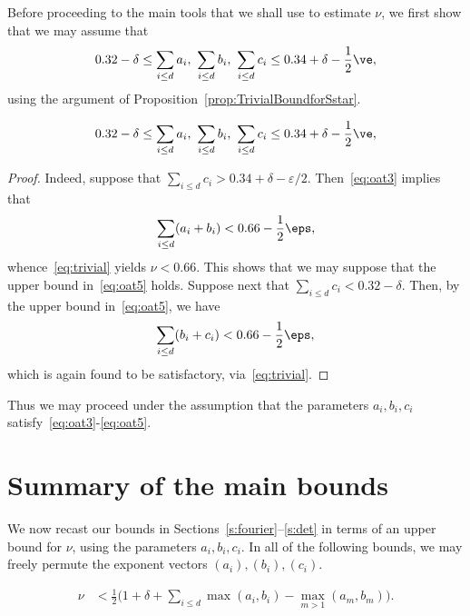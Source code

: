 Before proceeding to the main tools that we shall use to estimate $\nu$, we first show that we may assume that
\begin{equation*}
0.32 - \delta \leq \sum_{i\leq d} a_i ,~ \sum_{i\leq d} b_i ,~ \sum_{i\leq d} c_i \leq 0.34 + \delta- \frac{1}{2}\ve,
\end{equation*}
using the argument of Proposition~\ref{prop:TrivialBoundforSstar}.
\begin{proposition}\label{prop:Eqn4Point5}
  \begin{equation}\label{eq:oat5}
    0.32 - \delta \leq \sum_{i\leq d} a_i ,~ \sum_{i\leq d} b_i ,~ \sum_{i\leq d} c_i \leq 0.34 + \delta- \frac{1}{2}\ve,
  \end{equation}
\end{proposition}
\begin{proof}
  Indeed, suppose that
  $\sum_{i\leq d} c_i> 0.34 + \delta-\varepsilon/2$.
  Then~\eqref{eq:oat3} implies that
  \[
  \sum_{i\leq d} (a_i + b_i)<
  0.66-\frac{1}{2}\eps,
  \]
  whence~\eqref{eq:trivial} yields $\nu< 0.66$. This shows that we may suppose that the upper bound in~\eqref{eq:oat5} holds.
  Suppose next that
  $\sum_{i\leq d} c_i< 0.32 - \delta$. Then, by the upper bound in~\eqref{eq:oat5}, we have
  \[
  \sum_{i\leq d} (b_i + c_i)< 0.66-\frac{1}{2}\eps,
  \]
  which is again found to be satisfactory, via~\eqref{eq:trivial}.
\end{proof}

Thus we may proceed under the assumption that the parameters $a_i,b_i,c_i$ satisfy~\eqref{eq:oat3}-\eqref{eq:oat5}.

\section{Summary of the main bounds}

We now recast our bounds in Sections~\ref{s:fourier}--\ref{s:det} in terms of
an upper bound for $\nu$, using
the parameters $a_i,b_i,c_i$.
In all of the following bounds, we may freely permute the exponent vectors $(a_i),(b_i),(c_i)$.

\begin{proposition}\label{prop:FourierBound}
  \begin{align*}
  \nu & < \frac{1}{2}\Big(1+\delta +\sum_{i\leq d} \max(a_i,b_i) - \max_{m>1}(a_m,b_m)\Big).
  \end{align*}
\end{proposition}

